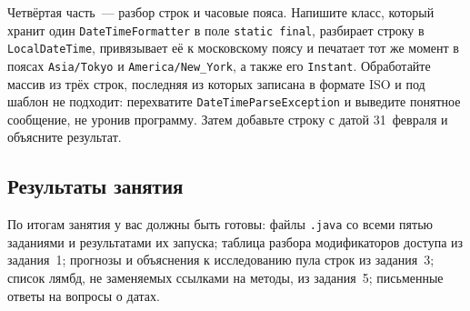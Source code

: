 Четвёртая часть~--- разбор строк и часовые пояса. Напишите класс, который
хранит один \texttt{DateTimeFormatter} в поле \texttt{static final}, разбирает
строку в \texttt{LocalDateTime}, привязывает её к московскому поясу и печатает
тот же момент в поясах \texttt{Asia/Tokyo} и \texttt{America/New\_York}, а
также его \texttt{Instant}. Обработайте массив из трёх строк, последняя из
которых записана в формате ISO и под шаблон не подходит: перехватите
\texttt{DateTimeParseException} и выведите понятное сообщение, не уронив
программу. Затем добавьте строку с датой 31~февраля и объясните результат.

\subsection*{Результаты занятия}

По итогам занятия у вас должны быть готовы: файлы \texttt{.java} со всеми
пятью заданиями и результатами их запуска; таблица разбора модификаторов
доступа из задания~1; прогнозы и объяснения к исследованию пула строк из
задания~3; список лямбд, не заменяемых ссылками на методы, из задания~5;
письменные ответы на вопросы о датах.

\kontrolvoprosy

